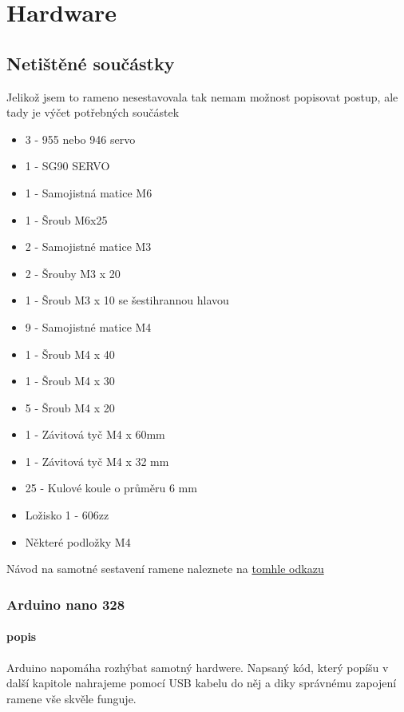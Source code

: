 \documentclass[12pt, a4paper,
twoside,        %
openright
]{report}
\begin{document}
{\chapter{Hardware}
	\section{Netištěné součástky}
Jelikož jsem to rameno nesestavovala tak nemam možnost popisovat postup, ale tady je výčet potřebných součástek 

\begin{itemize}
	\item	 3 - 955 nebo 946 servo
	\item 	1 - SG90 SERVO
	\item 	1 - Samojistná matice M6
	\item 	1 - Šroub M6x25
	\item 	2 - Samojistné matice M3
	\item 	2 - Šrouby M3 x 20
	\item 	1 - Šroub M3 x 10 se šestihrannou hlavou
	\item 	9 - Samojistné matice M4
	\item 	1 - Šroub M4 x 40
	\item 	1 - Šroub M4 x 30
	\item 	5 - Šroub M4 x 20
	\item 	1 - Závitová tyč M4 x 60mm
	\item 	1 - Závitová tyč M4 x 32 mm
	\item 	25 - Kulové koule o průměru 6 mm
	\item 	Ložisko 1 - 606zz
	\item 	Některé podložky M4
\end{itemize}


Návod na samotné sestavení ramene naleznete na \href{https://www.instructables.com/EEZYbotARM-Mk2-3D-Printed-Robot/}{tomhle odkazu} 
\newpage 


\subsection{Arduino nano 328}
\subsubsection{popis}

Arduino napomáha rozhýbat samotný hardwere. Napsaný kód, který popíšu v další kapitole nahrajeme pomocí USB kabelu do něj a diky správnému zapojení ramene vše skvěle funguje.


}
\end{document}
